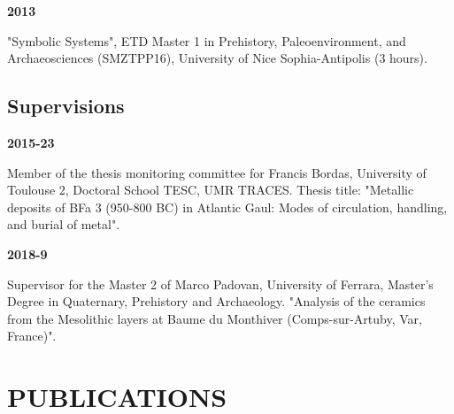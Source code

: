 \documentclass{article}
\newcommand{\fr}[1]{}       %
\newcommand{\en}[1]{#1}     %
\begin{document}
\smallbreak
\textbf{2013}
\fr{"Systèmes symboliques", ETD Master 1 Préhistoire, Paléoenvironnement et Archéosciences (SMZTPP16), Université Nice Sophia-Antipolis (3 heures).}
\en{"Symbolic Systems", ETD Master 1 in Prehistory, Paleoenvironment, and Archaeosciences (SMZTPP16), University of Nice Sophia-Antipolis (3 hours).}

\subsection*{\fr{Encadrements}\en{Supervisions}}

\textbf{2015-23}
\fr{Membre du comité de suivi de la thèse de Francis Bordas, Université Toulouse 2, École doctorale TESC, UMR TRACES. Titre de la thèse : "Les dépôts métalliques du BFa 3 (950-800 av. J.-C.) en Gaule atlantique Modalités de circulation, de manipulation et d’enfouissement du métal".}
\en{Member of the thesis monitoring committee for Francis Bordas, University of Toulouse 2, Doctoral School TESC, UMR TRACES. Thesis title: "Metallic deposits of BFa 3 (950-800 BC) in Atlantic Gaul: Modes of circulation, handling, and burial of metal".}

\smallbreak
\textbf{2018-9}
\fr{Tuteur du Master 2 de Marco Padovan, Università degli Studi di Ferrara, Corso di Laurea Magistrale in Quaternario, Preistoria e Archeologia. "Analyse de la céramique des couches mésolithiques à Baume du Monthiver (Comps-sur-Artuby, Var, France)".}
\en{Supervisor for the Master 2 of Marco Padovan, University of Ferrara, Master's Degree in Quaternary, Prehistory and Archaeology. "Analysis of the ceramics from the Mesolithic layers at Baume du Monthiver (Comps-sur-Artuby, Var, France)".}

\section{PUBLICATIONS}
\end{document}
